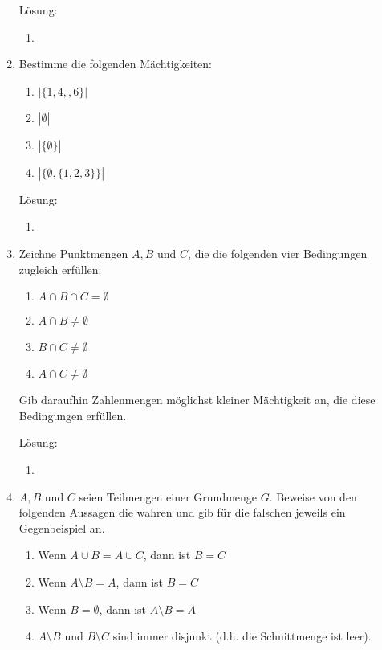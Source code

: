 \documentclass[../main.tex]{subfiles}
\begin{document}
\begin{enumerate}
	      Lösung:
	      \begin{enumerate}
		      \item
	      \end{enumerate}
	\item Bestimme die folgenden Mächtigkeiten:
	      \begin{multicols}{2}
		      \begin{enumerate}
			      \item \( |\{1, 4, ,6 \}| \)
			      \item \( |\emptyset| \)
			      \item \( |\{ \emptyset \}| \)
			      \item \( |\{ \emptyset, \{ 1, 2 ,3 \} \}| \)
		      \end{enumerate}
	      \end{multicols}
	      Lösung:
	      \begin{enumerate}
		      \item
	      \end{enumerate}
	\item Zeichne Punktmengen \( A, B \) und \( C \), die die folgenden vier Bedingungen
	      zugleich erfüllen:
	      \begin{multicols}{2}
		      \begin{enumerate}
			      \item \( A \cap B \cap C = \emptyset \)
			      \item \( A \cap B \neq \emptyset \)
			      \item \( B \cap C \neq \emptyset \)
			      \item \( A \cap C \neq \emptyset \)
		      \end{enumerate}
	      \end{multicols}
	      Gib daraufhin Zahlenmengen möglichst kleiner Mächtigkeit an, die diese
	      Bedingungen erfüllen.

	      Lösung:
	      \begin{enumerate}
		      \item
	      \end{enumerate}
	\item \( A, B \) und \( C \) seien Teilmengen einer Grundmenge \( G \).
	      Beweise von den folgenden Aussagen die wahren und gib für die falschen jeweils ein Gegenbeispiel an.
	      \begin{enumerate}
		      \item Wenn \( A \cup B = A \cup C \), dann ist \( B = C \)
		      \item Wenn \( A \setminus B = A \), dann ist \( B = C \)
		      \item Wenn \( B = \emptyset \), dann ist \(  A \setminus B  = A \)
		      \item \( A \setminus B  \) und \( B \setminus C \) sind immer disjunkt
		            (d.h. die Schnittmenge ist leer).
	      \end{enumerate}


\end{enumerate}
\end{document}
